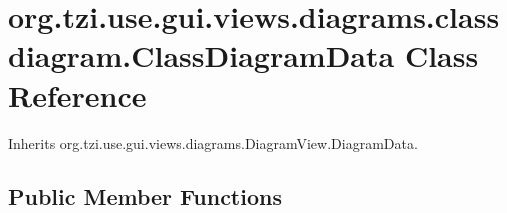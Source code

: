\hypertarget{classorg_1_1tzi_1_1use_1_1gui_1_1views_1_1diagrams_1_1classdiagram_1_1_class_diagram_data}{\section{org.\-tzi.\-use.\-gui.\-views.\-diagrams.\-classdiagram.\-Class\-Diagram\-Data Class Reference}
\label{classorg_1_1tzi_1_1use_1_1gui_1_1views_1_1diagrams_1_1classdiagram_1_1_class_diagram_data}
}


Inherits org.\-tzi.\-use.\-gui.\-views.\-diagrams.\-Diagram\-View.\-Diagram\-Data.

\subsection*{Public Member Functions}
